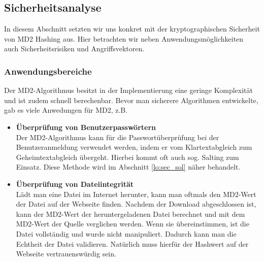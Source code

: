 \subsection{Sicherheitsanalyse}

In diesem Abschnitt setzten wir uns konkret mit der kryptographischen Sicherheit 
von MD2 Hashing aus. Hier betrachten wir neben Anwendungsmöglichkeiten auch 
Sicherheitsrisiken und Angriffsvektoren.

\subsubsection{Anwendungsbereiche}
Der MD2-Algorithmus besitzt in der Implementierung eine geringe Komplexität 
und ist zudem schnell berechenbar. Bevor man sicherere Algorithmen entwickelte,
gab es viele Anwedungen für MD2, z.B\@.
\begin{itemize}
      \item \textbf{Überprüfung von Benutzerpasswörtern}
            \\
            Der MD2-Algorithmus kann für die Passwortüberprüfung bei der Benutzeranmeldung
            verwendet werden, indem er vom Klartextabgleich zum Geheimtextabgleich übergeht.
            Hierbei kommt oft auch sog. \glqq Salting \grqq zum Einsatz. Diese Methode 
            wird im Abschnitt \ref{lo:sec_sol} näher behandelt.
      \item \textbf{Überprüfung von Dateiintegrität}
            \\
            Lädt man eine Datei im Internet herunter, kann man oftmals den MD2-Wert 
            der Datei auf der Webseite finden.
            Nachdem der Download abgeschlossen ist, kann der MD2-Wert der heruntergeladenen Datei
            berechnet und mit dem MD2-Wert der Quelle verglichen werden.
            Wenn sie übereinstimmen, ist die Datei vollständig und wurde nicht manipuliert.
            Dadurch kann man die Echtheit der Datei validieren. Natürlich muss 
            hierfür der Hashwert auf der Webseite vertrauenswürdig sein.
     
\end{itemize}

